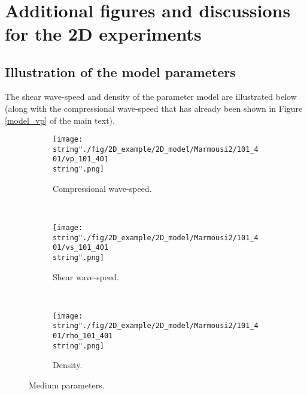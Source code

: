 \ \newline
\ \newline
\ \newline



\newpage
\section{Additional figures and discussions for the 2D experiments}\label{SM_2D}

\subsection{Illustration of the model parameters}\label{SM_2D_model}
The shear wave-speed and density of the parameter model are illustrated below (along with the compressional wave-speed that has already been shown in Figure \ref{model_vp} of the main text). 

\begin{figure}[H]
\captionsetup{width=0.95\textwidth,font=footnotesize,labelfont=footnotesize}
\centering
%
\begin{subfigure}[b]{1\textwidth}
%
\centering\texttt{[image: \\string"./fig/2D\_example/2D\_model/Marmousi2/101\_401/vp\_101\_401\\string".png]}
%
\vspace{-0.5em}
\caption{Compressional wave-speed.}
\end{subfigure}\hfill
\\[1ex]
%
\begin{subfigure}[b]{1\textwidth}
%
\centering\texttt{[image: \\string"./fig/2D\_example/2D\_model/Marmousi2/101\_401/vs\_101\_401\\string".png]}
%
\vspace{-0.5em}
\caption{Shear wave-speed.}
\end{subfigure}\hfill
\\[1ex]
%
\begin{subfigure}[b]{1\textwidth}
%
\centering\texttt{[image: \\string"./fig/2D\_example/2D\_model/Marmousi2/101\_401/rho\_101\_401\\string".png]}
%
\vspace{-0.5em}
\caption{Density.}
\end{subfigure}\hfill
%
\caption{Medium parameters.}
\label{SM_medium_parameters}
\end{figure}


